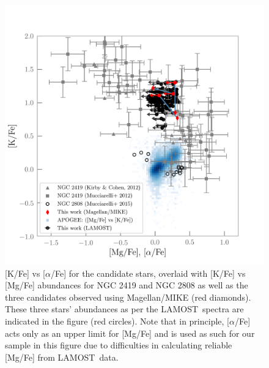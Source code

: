 \documentclass[a4paper,fleqn,usenatbib]{mnras}
\newcommand{\project}[1]{#1}
\newcommand{\lamost}{\project{LAMOST}}
\begin{document}
\begin{figure}
	\includegraphics[width=\columnwidth]{KvsMg.png}
    \caption{[K/Fe] vs [$\alpha$/Fe] for the candidate stars, overlaid with [K/Fe] vs [Mg/Fe] abundances for NGC 2419 and NGC 2808 \citep{cohenkirby2012, mucciarelli2012, mucciarelli2015} as well as the three candidates observed using Magellan/MIKE (red diamonds). These three stars' abundances as per the \lamost\ spectra are indicated in the figure (red circles). Note that in principle, [$\alpha$/Fe] acts only as an upper limit for [Mg/Fe] and is used as such for our sample in this figure due to difficulties in calculating reliable [Mg/Fe] from \lamost\ data.}
    \label{KvsMg}
\end{figure}
\end{document}
